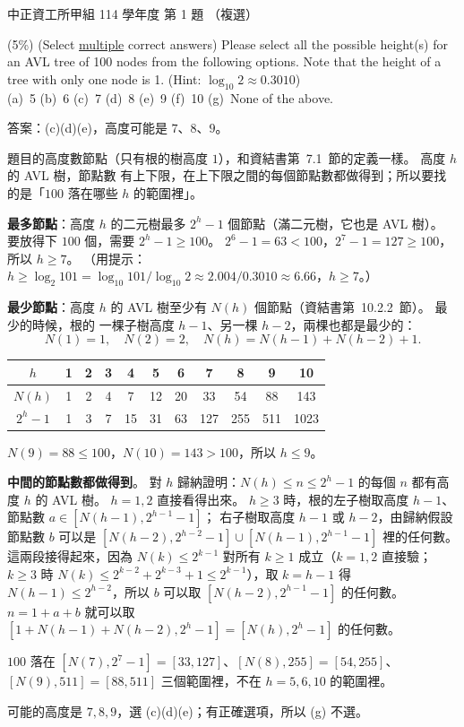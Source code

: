 \begin{pastexam}[label={px:ccu-114-swa-01}]{中正資工所甲組 114 學年度 第 1 題}
（複選）

(5\%) (Select \underline{multiple} correct answers) Please select all the possible height(s) for an AVL
tree of 100 nodes from the following options. Note that the height of a tree with only one node is 1.
(Hint: $\log_{10}2\approx 0.3010$)\\
(a)~5 \qquad (b)~6 \qquad (c)~7 \qquad (d)~8 \qquad (e)~9 \qquad (f)~10 \qquad (g)~None of the above.
\end{pastexam}

\begin{pastsoln}
答案：(c)(d)(e)，高度可能是 $7$、$8$、$9$。

題目的高度數節點（只有根的樹高度 $1$），和資結書第~7.1~節的定義一樣。 高度 $h$ 的 AVL 樹，節點數
有上下限，在上下限之間的每個節點數都做得到；所以要找的是「$100$ 落在哪些 $h$ 的範圍裡」。

\textbf{最多節點}：高度 $h$ 的二元樹最多 $2^h - 1$ 個節點（滿二元樹，它也是 AVL 樹）。 要放得下 $100$
個，需要 $2^h - 1 \ge 100$。 $2^6 - 1 = 63 < 100$，$2^7 - 1 = 127 \ge 100$，所以 $h \ge 7$。 （用提示：
$h \ge \log_2 101 = \log_{10} 101 / \log_{10} 2 \approx 2.004 / 0.3010 \approx 6.66$，$h \ge 7$。）

\textbf{最少節點}：高度 $h$ 的 AVL 樹至少有 $N(h)$ 個節點（資結書第~10.2.2~節）。 最少的時候，根的
一棵子樹高度 $h - 1$、另一棵 $h - 2$，兩棵也都是最少的：
\[
N(1) = 1,\quad N(2) = 2,\quad N(h) = N(h-1) + N(h-2) + 1.
\]
\begin{center}
\small
\begin{tabular}{c*{10}{c}}
\toprule
$h$ & 1 & 2 & 3 & 4 & 5 & 6 & 7 & 8 & 9 & 10 \\
\midrule
$N(h)$ & 1 & 2 & 4 & 7 & 12 & 20 & 33 & 54 & 88 & 143 \\
$2^h - 1$ & 1 & 3 & 7 & 15 & 31 & 63 & 127 & 255 & 511 & 1023 \\
\bottomrule
\end{tabular}
\end{center}
$N(9) = 88 \le 100$，$N(10) = 143 > 100$，所以 $h \le 9$。

\textbf{中間的節點數都做得到}。 對 $h$ 歸納證明：$N(h) \le n \le 2^h - 1$ 的每個 $n$ 都有高度 $h$ 的 AVL
樹。 $h = 1, 2$ 直接看得出來。 $h \ge 3$ 時，根的左子樹取高度 $h - 1$、節點數 $a \in [N(h-1), 2^{h-1} - 1]$；
右子樹取高度 $h - 1$ 或 $h - 2$，由歸納假設節點數 $b$ 可以是 $[N(h-2), 2^{h-2} - 1] \cup [N(h-1),
2^{h-1} - 1]$ 裡的任何數。 這兩段接得起來，因為 $N(k) \le 2^{k-1}$ 對所有 $k \ge 1$ 成立（$k = 1, 2$ 直接驗；$k \ge 3$ 時 $N(k) \le 2^{k-2} + 2^{k-3} + 1 \le 2^{k-1}$），取 $k = h - 1$ 得 $N(h-1) \le 2^{h-2}$，所以 $b$ 可以取 $[N(h-2), 2^{h-1} - 1]$ 的任何數。 $n = 1 + a + b$ 就可以取
$[1 + N(h-1) + N(h-2), 2^h - 1] = [N(h), 2^h - 1]$ 的任何數。

$100$ 落在 $[N(7), 2^7 - 1] = [33, 127]$、$[N(8), 255] = [54, 255]$、
$[N(9), 511] = [88, 511]$ 三個範圍裡，不在 $h = 5, 6, 10$ 的範圍裡。

可能的高度是 $7, 8, 9$，選 (c)(d)(e)；有正確選項，所以 (g) 不選。
\end{pastsoln}
